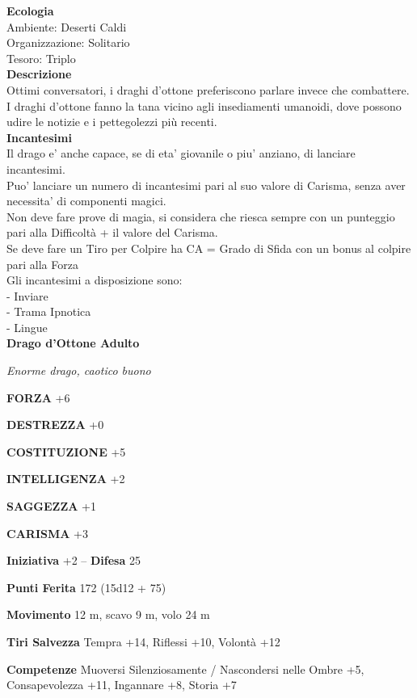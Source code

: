\begin{multicols}{2}
\textbf{Ecologia}\\
Ambiente: Deserti Caldi\\
Organizzazione: Solitario\\
Tesoro: Triplo\\
\textbf{Descrizione}\\
Ottimi conversatori, i draghi d'ottone preferiscono parlare invece che combattere. I draghi d'ottone fanno la tana vicino agli insediamenti umanoidi, dove possono udire le notizie e i pettegolezzi più recenti.\\
\textbf{Incantesimi}\\
Il drago e' anche capace, se di eta' giovanile o piu' anziano, di lanciare incantesimi.\\
Puo' lanciare un numero di incantesimi pari al suo valore di Carisma, senza aver necessita' di componenti magici.\\
Non deve fare prove di magia, si considera che riesca sempre con un punteggio pari alla Difficoltà + il valore del Carisma.\\
Se deve fare un Tiro per Colpire ha CA = Grado di Sfida con un bonus al colpire pari alla Forza\\
Gli incantesimi a disposizione sono:\\
- Inviare\\
- Trama Ipnotica\\
- Lingue\\


\medskip{}\textbf{Drago d'Ottone Adulto}

\emph{Enorme drago, caotico buono}

\textbf{FORZA} +6

\textbf{DESTREZZA} +0

\textbf{COSTITUZIONE} +5

\textbf{INTELLIGENZA} +2

\textbf{SAGGEZZA} +1

\textbf{CARISMA} +3

\textbf{Iniziativa} +2 -- \textbf{Difesa} 25

\textbf{Punti Ferita} 172 (15d12 + 75)

\textbf{Movimento} 12 m, scavo 9 m, volo 24 m

\textbf{Tiri Salvezza} Tempra +14, Riflessi +10, Volontà +12

\textbf{Competenze} Muoversi Silenziosamente / Nascondersi nelle Ombre +5, Consapevolezza +11, Ingannare +8, Storia +7


\end{multicols}

